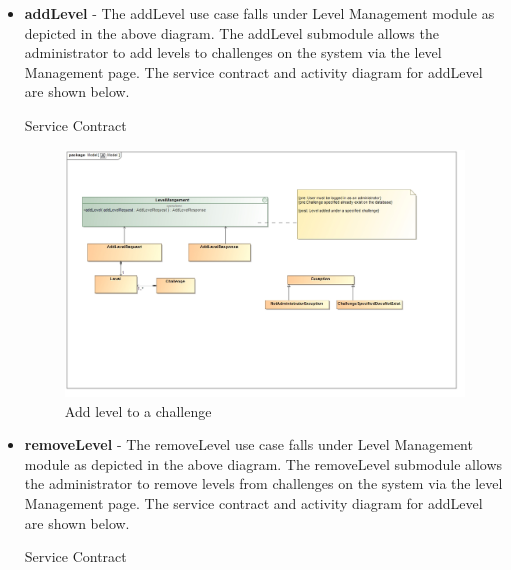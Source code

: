 \documentclass[english]{article}
\begin{document}
	    \begin{itemize}
	    	
	    \item \textbf{addLevel} -  The addLevel use case falls under Level Management module as depicted in the above diagram.  The addLevel submodule allows the administrator to add levels to challenges on the system via the level Management page. The service contract and activity diagram for addLevel are shown below.	

	    \begin{center}
	    	Service Contract
	    \end{center}
	    
	    \begin{figure}[H]
	    	\begin{center}
	    		\includegraphics[scale=0.2]{AddLevelContract.jpg}
	    	\end{center}
	    	\caption{Add level to a challenge}
	    	
	    \end{figure}
	    
	    \item \textbf{removeLevel} -  The removeLevel use case falls under Level Management module as depicted in the above diagram.  The removeLevel submodule allows the administrator to remove levels from challenges on the system via the level Management page. The service contract and activity diagram for addLevel are shown below.	
	    
	     \begin{center}
	     	Service Contract
	     \end{center}
	     

\end{itemize}
\end{document}
